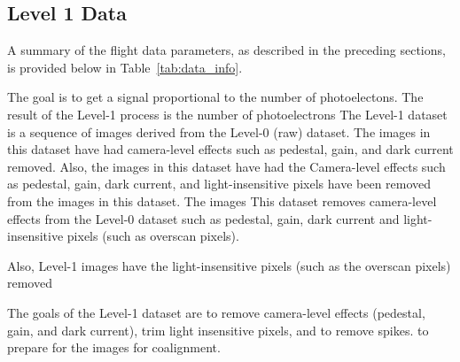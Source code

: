     
    \subsection{Level 1 Data}
	    
  
    
    	
    	
    	A summary of the flight data parameters, as described in the preceding sections, is provided below in Table~\ref{tab:data_info}. 
    	
        The goal is to get a signal proportional to the number of photoelectons. 
        The result of the Level-1 process is the number of photoelectrons 
        The Level-1 dataset is a sequence of images derived from the Level-0 (raw) dataset.
        The images in this dataset have had camera-level effects such as pedestal, gain, and dark current removed.
        Also, the images in this dataset have had the 
        Camera-level effects such as pedestal, gain, dark current, and light-insensitive pixels have been removed from the images in this dataset.
        The images 
        This dataset removes camera-level effects from the Level-0 dataset such as pedestal, gain, dark current and light-insensitive pixels (such as overscan pixels).
        
        
        Also, Level-1 images have the light-insensitive pixels (such as the overscan pixels) removed 
    
        The goals of the Level-1 dataset are to remove camera-level effects (pedestal, gain, and dark current), trim light insensitive pixels, and to remove spikes. to prepare for the images for coalignment.
    
